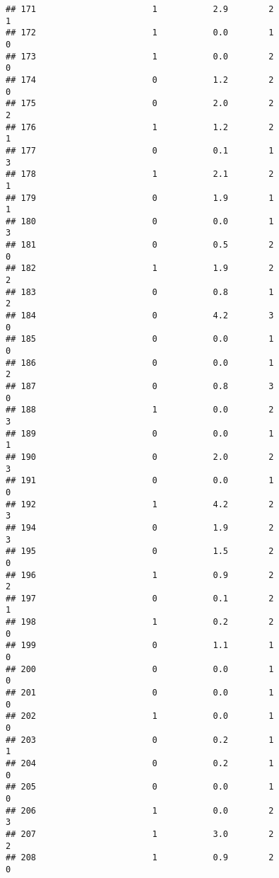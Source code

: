 \documentclass[]{article}
\begin{document}
\begin{verbatim}
## 171                       1           2.9        2                 1
## 172                       1           0.0        1                 0
## 173                       1           0.0        2                 0
## 174                       0           1.2        2                 0
## 175                       0           2.0        2                 2
## 176                       1           1.2        2                 1
## 177                       0           0.1        1                 3
## 178                       1           2.1        2                 1
## 179                       0           1.9        1                 1
## 180                       0           0.0        1                 3
## 181                       0           0.5        2                 0
## 182                       1           1.9        2                 2
## 183                       0           0.8        1                 2
## 184                       0           4.2        3                 0
## 185                       0           0.0        1                 0
## 186                       0           0.0        1                 2
## 187                       0           0.8        3                 0
## 188                       1           0.0        2                 3
## 189                       0           0.0        1                 1
## 190                       0           2.0        2                 3
## 191                       0           0.0        1                 0
## 192                       1           4.2        2                 3
## 194                       0           1.9        2                 3
## 195                       0           1.5        2                 0
## 196                       1           0.9        2                 2
## 197                       0           0.1        2                 1
## 198                       1           0.2        2                 0
## 199                       0           1.1        1                 0
## 200                       0           0.0        1                 0
## 201                       0           0.0        1                 0
## 202                       1           0.0        1                 0
## 203                       0           0.2        1                 1
## 204                       0           0.2        1                 0
## 205                       0           0.0        1                 0
## 206                       1           0.0        2                 3
## 207                       1           3.0        2                 2
## 208                       1           0.9        2                 0

\end{verbatim}
\end{document}
